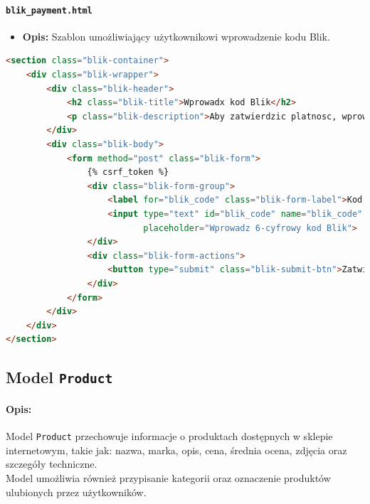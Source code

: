 \documentclass[12pt,a4paper,oneside]{article}
\theoremstyle{definition}
\numberwithin{equation}{section}
\begin{document}
\paragraph{\texttt{blik\_payment.html}}
\begin{itemize}
    \item \textbf{Opis:} Szablon umożliwiający użytkownikowi wprowadzenie kodu Blik.
\end{itemize}

\begin{lstlisting}[language=HTML, caption=Szablon blik_payment.html]
<section class="blik-container">
    <div class="blik-wrapper">
        <div class="blik-header">
            <h2 class="blik-title">Wprowadx kod Blik</h2>
            <p class="blik-description">Aby zatwierdzic platnosc, wprowadz 6-cyfrowy kod wygenerowany w aplikacji mobilnej banku.</p>
        </div>
        <div class="blik-body">
            <form method="post" class="blik-form">
                {% csrf_token %}
                <div class="blik-form-group">
                    <label for="blik_code" class="blik-form-label">Kod Blik</label>
                    <input type="text" id="blik_code" name="blik_code" maxlength="6" class="blik-form-input"
                           placeholder="Wprowadz 6-cyfrowy kod Blik">
                </div>
                <div class="blik-form-actions">
                    <button type="submit" class="blik-submit-btn">Zatwierdz kod</button>
                </div>
            </form>
        </div>
    </div>
</section>
\end{lstlisting}

% 
% 
\clearpage
\subsection{Model \texttt{Product}}
\paragraph{Opis:}  Model \texttt{Product} przechowuje informacje o produktach dostępnych w sklepie internetowym,
    takie jak: nazwa, marka, opis, cena, średnia ocena, zdjęcia oraz szczegóły techniczne.\\
    Model umożliwia również przypisanie kategorii oraz oznaczenie produktów ulubionych przez użytkowników.
\end{document}
